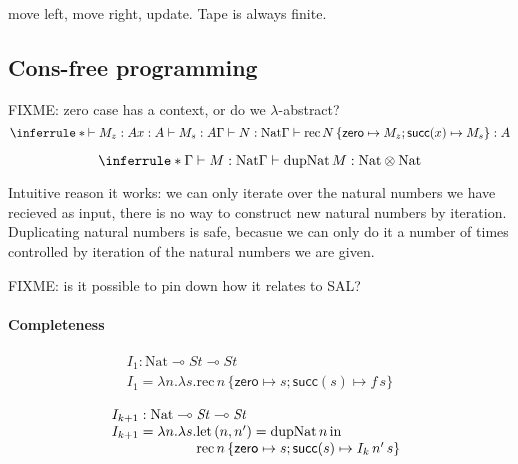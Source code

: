 \documentclass[acmsmall,review]{acmart}
\newcommand{\tmRec}{\mathrm{rec}}
\newcommand{\tyNat}{\mathrm{Nat}}
\newcommand{\conZero}{\mathsf{zero}}
\newcommand{\conSucc}{\mathsf{succ}}
\newcommand{\Let}{\mathrm{let}}
\newcommand{\In}{\mathrm{in}}
\newcommand{\dupNat}{\mathrm{dupNat}}
\begin{document}
move left, move right, update. Tape is always finite.

\subsection{Cons-free programming}

FIXME: zero case has a context, or do we $\lambda$-abstract?
\begin{displaymath}
  \inferrule*
  {\vdash M_z : A \\ x : A \vdash M_s : A \\ \Gamma \vdash N : \tyNat}
  {\Gamma \vdash \tmRec\,N\,\{\conZero \mapsto M_z; \conSucc(x) \mapsto M_s\} : A}
\end{displaymath}

\begin{displaymath}
  \inferrule*
  {\Gamma \vdash M : \tyNat}
  {\Gamma \vdash \dupNat\,M : \tyNat \otimes \tyNat}
\end{displaymath}

Intuitive reason it works: we can only iterate over the natural
numbers we have recieved as input, there is no way to construct new
natural numbers by iteration. Duplicating natural numbers is safe,
becasue we can only do it a number of times controlled by iteration of
the natural numbers we are given.

FIXME: is it possible to pin down how it relates to SAL?

\paragraph{Completeness}

\begin{displaymath}
  \begin{array}{l}
    I_1 : \tyNat \multimap \mathit{St} \multimap \mathit{St} \\
    I_1 = \lambda n. \lambda s.\tmRec\,n\,\{\conZero \mapsto s; \conSucc(s) \mapsto f\,s \}
  \end{array}
\end{displaymath}

\begin{displaymath}
  \begin{array}{l}
    I_{k+1} : \tyNat \multimap \mathit{St} \multimap \mathit{St} \\
    I_{k+1} = \lambda n. \lambda s.
    \begin{array}[t]{@{}l}
      \Let\,(n,n') = \dupNat\,n\,\In\\
      \tmRec\,n\,\{\conZero \mapsto s; \conSucc(s) \mapsto I_k\,n'\,s \}
    \end{array}
  \end{array}
\end{displaymath}
\end{document}
